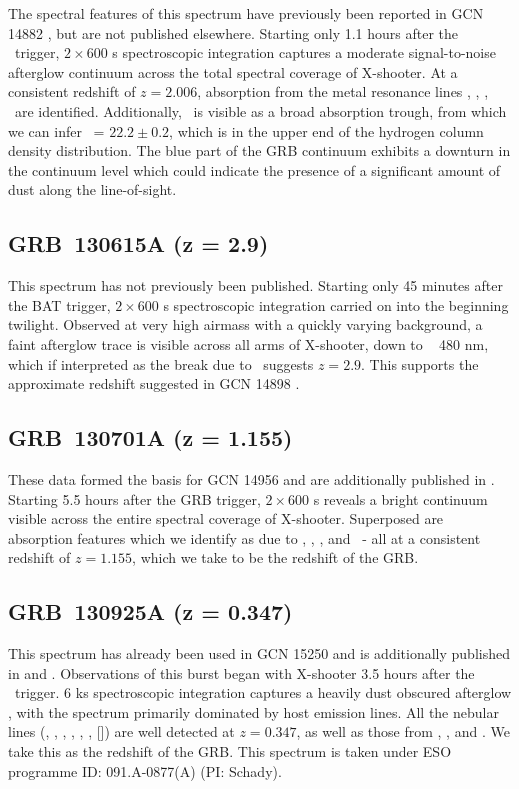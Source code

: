 \documentclass[longauth]{aa}    %
\begin{document}
The spectral features of this spectrum have previously been reported in GCN 14882
\citep{GCN14882}, but are not published elsewhere. Starting only 1.1 hours after
the \swift~trigger, $2\times600$ s spectroscopic integration captures a moderate
signal-to-noise afterglow continuum across the total spectral coverage of
X-shooter. At a consistent redshift of $z = 2.006$, absorption from the metal
resonance lines \feii, \mnii, \mgii, \mgi~are identified. Additionally, \lya~is
visible as a broad absorption trough, from which we can infer \nh~= $22.2 \pm 0.2$,
which is in the upper end of the hydrogen column density distribution. The blue
part of the GRB continuum exhibits a downturn in the continuum level which could
indicate the presence of a significant amount of dust along the line-of-sight.

\subsection{GRB~130615A (z = 2.9)} \label{130615}

This spectrum has not previously been published. Starting only 45 minutes after
the BAT trigger, $2\times600$ s spectroscopic integration carried on into the
beginning twilight. Observed at very high airmass with a quickly varying
background, a faint afterglow trace is visible across all arms of X-shooter,
down to ~ 480 nm, which if interpreted as the break due to \lya~suggests $z =
2.9$. This supports the approximate redshift suggested in GCN 14898
\citep{GCN14898}.


\subsection{GRB~130701A (z = 1.155)}\label{130701}

These data formed the basis for GCN 14956 \citep{GCN14956} and are additionally
published in \citet{Kruhler2015}. Starting 5.5 hours after the GRB trigger,
$2\times600$ s reveals a bright continuum visible across the entire spectral
coverage of X-shooter. Superposed are absorption features which we identify as
due to \feii, \mgii, \mgi, and \caii~- all at a consistent redshift of $z =
1.155$, which we take to be the redshift of the GRB.

\subsection{GRB~130925A (z = 0.347)}\label{130925}

This spectrum has already been used in GCN 15250 \citep{GCN15250} and is
additionally published in \citet{Schady2015} and \citet{Kruhler2015}.
Observations of this burst began with X-shooter 3.5 hours after the
\swift~trigger. 6 ks spectroscopic integration captures a heavily dust obscured
afterglow \citep[A$_\mathrm{V} = 5.9 \pm 0.7$;][]{Greiner2014}, with the
spectrum primarily dominated by host emission lines. All the nebular lines
(\oii, \hg, \hb, \oii, \ha, \nii, [\sii]) are well detected at $z = 0.347$, as
well as those from \pad, \pag, and \pab. We take this as the redshift of the
GRB. This spectrum is taken under ESO programme ID: 091.A-0877(A) (PI: Schady).
\end{document}

